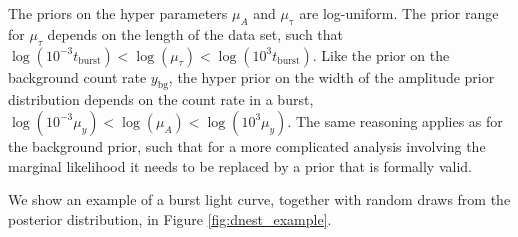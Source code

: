 \documentclass[12pt]{emulateapj}
\newcommand{\given}{\,|\,}
\newcommand{\counts}{y}
\newcommand{\pars}{\theta}
\newcommand{\mean}{\lambda}
\newcommand{\Poisson}{{\mathcal P}}
\newcommand{\bg}{\mathrm{bg}}
\begin{document}
The priors on the hyper parameters $\mu_{A}$ and $\mu_{\mathrm{\tau}}$ are log-uniform. The prior range for
$\mu_{\tau}$ depends on the length of the data set, such that $\log{(10^{-3}t_{\mathrm{burst}})} < \log{(\mu_{\tau})} < \log{(10^{3}t_\mathrm{burst})}$.
Like the prior on the background count rate $\counts_{\mathrm{bg}}$, the hyper prior on the width of the amplitude prior distribution
depends on the count rate in a burst, $\log{(10^{-3}\mu_\counts)} < \log{(\mu_{A})} < \log{(10^{3} \mu_\counts)}$. The same reasoning applies as
for the background prior, such that for a more complicated analysis involving the marginal likelihood it needs to be replaced
by a prior that is formally valid.

We show an example of a burst light curve, together with random draws from the posterior distribution, in Figure \ref{fig:dnest_example}.



  
 





\end{document}
